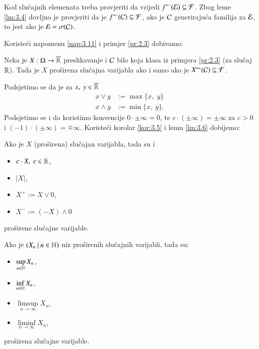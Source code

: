 \begin{nap} \label{nap:3.11}
    Kod slu\v cajnih elemenata treba provjeriti da vrijedi ${f}^{\leftarrow}(\mathcal{E}) \subseteq \mathcal{F}$. Zbog leme \ref{lm:3.4} dovljno je provjeriti da je ${f}^{\leftarrow}(\mathcal{C}) \subseteq \mathcal{F}$, ako je $\mathcal{C}$ generiraju\' ca familija za $\mathcal{E}$, to jest ako je $\mathcal{E} = \sigma({\mathcal{C}})$.
\end{nap}

Koriste\' ci napomenu \ref{nap:3.11} i primjer \ref{pr:2.3} dobivamo:

\begin{kor} \label{kor:3.12}
    Neka je $X : \Omega \to \overline{\mathbb{R}}$ preslikavanje i $\mathcal{C}$ bilo koja klasa iz primjera \ref{pr:2.3} (za slu\v caj $\mathbb{R}$).
    Tada je $X$ pro\v sirena slu\v cajna varijabla ako i samo ako je ${X}^{\leftarrow}(\mathcal{C}) \subseteq \mathcal{F}$.
\end{kor}

Podsjetimo se da je za $x, \; y \in \overline{\mathbb{R}}$
\begin{equation*}
    \begin{aligned}
        x \lor y &:= \max \{x, \; y\}\\
        x \land y &:= \min \{x, \: y\}.
    \end{aligned}
\end{equation*}
Podsjetimo se i da koristimo konvencije $0 \cdot \pm \infty = 0$, te $c \cdot (\pm \infty) = \pm \infty$ za $c > 0$ i $(-1) \cdot (\pm \infty) = \mp \infty$. Koriste\' ci korolar \ref{kor:3.5} i lemu \ref{lm:3.6} dobijemo:

\begin{kor} \label{kor:3.13}
    Ako je $X$ (pro\v sirena) slu\v cajan varijabla, tada su i
    \begin{itemize}[label=]
        \item $c \cdot X, \; c \in \mathbb{R}$,
        \item $|X|$,
        \item $X^+ := X \lor 0$,
        \item $X^- := (-X) \land 0$
    \end{itemize}
    pro\v sirene slu\v cajne varijable.
\end{kor}

\begin{kor} \label{kor:3.14}
    Ako je $({X_n} \: | \: {n \in \mathbb{N}})$ niz pro\v sirenih slu\v cajnih varijabli, tada su:
    \begin{itemize}[label=]
        \item $\sup\limits_{n \in \mathbb{N}} X_n$,
        \item $\inf\limits_{n \in \mathbb{N}} X_n$,
        \item $\limsup\limits_{n \to \infty} X_n$,
        \item $\liminf\limits_{n \to \infty} X_n$,
    \end{itemize}
    pro\v sirena slu\v cajne varijable.
\end{kor}


